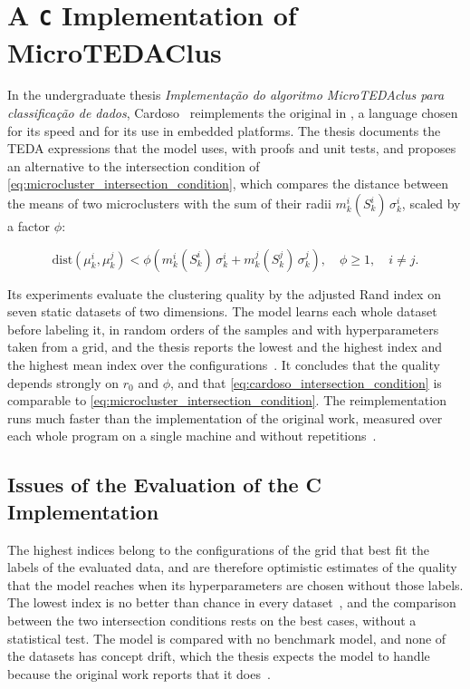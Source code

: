 \section{A \texttt{C} Implementation of MicroTEDAClus}
\label{sec:c_implementation}

In the undergraduate thesis \textit{Implementação do algoritmo MicroTEDAclus para classificação de dados}, Cardoso~\cite{cardoso2022microtedaclus} reimplements the original \MicroTEDAClus in , a language chosen for its speed and for its use in embedded platforms. The thesis documents the TEDA expressions that the model uses, with proofs and unit tests, and proposes an alternative to the intersection condition of \cref{eq:microcluster_intersection_condition}, which compares the distance between the means of two microclusters with the sum of their radii $m^i_k(S^i_k)\,\sigma^i_k$, scaled by a factor $\phi$:

\begin{equation}
    \text{dist}(\mu^i_k, \mu^j_k) < \phi \left( m^i_k(S^i_k)\,\sigma^i_k + m^j_k(S^j_k)\,\sigma^j_k \right), \quad \phi \ge 1, \quad i \neq j.
    \label{eq:cardoso_intersection_condition}
\end{equation}

Its experiments evaluate the clustering quality by the adjusted Rand index on seven static datasets of two dimensions. The model learns each whole dataset before labeling it, in random orders of the samples and with hyperparameters taken from a grid, and the thesis reports the lowest and the highest index and the highest mean index over the configurations~\cite[Section 4.3]{cardoso2022microtedaclus}. It concludes that the quality depends strongly on $r_0$ and $\phi$, and that \cref{eq:cardoso_intersection_condition} is comparable to \cref{eq:microcluster_intersection_condition}. The reimplementation runs much faster than the  implementation of the original work, measured over each whole program on a single machine and without repetitions~\cite[Section 4.4]{cardoso2022microtedaclus}.

\subsection{Issues of the Evaluation of the C Implementation}

The highest indices belong to the configurations of the grid that best fit the labels of the evaluated data, and are therefore optimistic estimates of the quality that the model reaches when its hyperparameters are chosen without those labels. The lowest index is no better than chance in every dataset~\cite[Tables 4.1 and 4.2]{cardoso2022microtedaclus}, and the comparison between the two intersection conditions rests on the best cases, without a statistical test. The model is compared with no benchmark model, and none of the datasets has concept drift, which the thesis expects the model to handle because the original work reports that it does~\cite[Section 4.2]{cardoso2022microtedaclus}.

